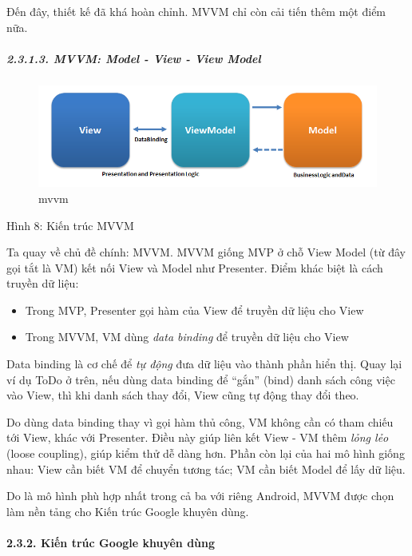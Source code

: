 Đến đây, thiết kế đã khá hoàn chỉnh. MVVM chỉ còn cải tiến thêm một điểm
nữa.

\hypertarget{mvvm-model---view---view-model}{%
  \subparagraph{2.3.1.3. MVVM: Model - View - View
    Model}\label{mvvm-model---view---view-model}}

\begin{figure}
  \centering
  \includegraphics{../images/MVVMPattern.png}
  \caption{mvvm}
\end{figure}

Hình 8: Kiến trúc MVVM

Ta quay về chủ đề chính: MVVM. MVVM giống MVP ở chỗ View Model (từ đây
gọi tắt là VM) kết nối View và Model như Presenter. Điểm khác biệt là
cách truyền dữ liệu:

\begin{itemize}
  
  \item
        Trong MVP, Presenter gọi hàm của View để truyền dữ liệu cho View
  \item
        Trong MVVM, VM dùng \emph{data binding} để truyền dữ liệu cho View
\end{itemize}

Data binding là cơ chế để \emph{tự động} đưa dữ liệu vào thành phần hiển
thị. Quay lại ví dụ ToDo ở trên, nếu dùng data binding để ``gắn'' (bind)
danh sách công việc vào View, thì khi danh sách thay đổi, View cũng tự
động thay đổi theo.

Do dùng data binding thay vì gọi hàm thủ công, VM không cần có tham
chiếu tới View, khác với Presenter. Điều này giúp liên kết View - VM
thêm \emph{lỏng lẻo} (loose coupling), giúp kiểm thử dễ dàng hơn. Phần
còn lại của hai mô hình giống nhau: View cần biết VM để chuyển tương
tác; VM cần biết Model để lấy dữ liệu.

Do là mô hình phù hợp nhất trong cả ba với riêng Android, MVVM được chọn
làm nền tảng cho Kiến trúc Google khuyên dùng.

\hypertarget{kiux1ebfn-truxfac-google-khuyuxean-duxf9ng}{%
  \paragraph{\texorpdfstring{2.3.2. Kiến trúc Google khuyên dùng
    }{2.3.2. Kiến trúc Google khuyên dùng }}\label{kiux1ebfn-truxfac-google-khuyuxean-duxf9ng}}

